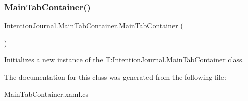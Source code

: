 \subsubsection{\texorpdfstring{Main\+Tab\+Container()}{MainTabContainer()}}
{\footnotesize\ttfamily Intention\+Journal.\+Main\+Tab\+Container.\+Main\+Tab\+Container (\begin{DoxyParamCaption}{ }\end{DoxyParamCaption})\hspace{0.3cm}{\ttfamily [inline]}}



Initializes a new instance of the T\+:\+Intention\+Journal.\+Main\+Tab\+Container class. 



The documentation for this class was generated from the following file\+:\begin{DoxyCompactItemize}
\item 
Main\+Tab\+Container.\+xaml.\+cs\end{DoxyCompactItemize}
